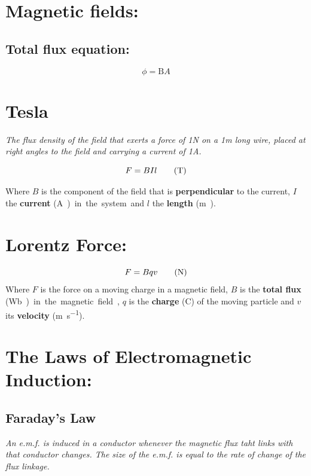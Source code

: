 \documentclass[11pt]{article}
\begin{document}
                          
\section{Magnetic fields: }
\subsection{Total flux equation: }
\begin{equation}
	\phi = \mathrm{B}A\tag{\si\weber}
\end{equation}


  \section{Tesla}
  \begin{center}
  	\textit{The flux density of the field that exerts a force of 1\si{\newton} on a 1\si{\meter} long wire, placed at right angles to the field and carrying a current of 1\si{\ampere}.}
  \end{center}
\begin{equation}
	F=BIl\tag{\si{\tesla}}
\end{equation}
\begin{center}
	Where $B$ is the component of the field that is \textbf{perpendicular} to the current, $I$ the \textbf{current} (\si\ampere) in the system and $l$ the \textbf{length} (\si\meter).
\end{center}
\section{Lorentz Force: }
\begin{equation}
	F=Bqv\tag{\si{\newton}}
\end{equation}
Where $F$ is the force on a moving charge in a magnetic field, $B$ is the \textbf{total flux} (\si\weber) in the magnetic field, $q$ is the \textbf{charge} (\si{\coulomb}) of the moving particle and $v$ its \textbf{velocity} (\si{\meter\per\second}).

\section{The Laws of Electromagnetic Induction: }

\subsection{Faraday's Law}

\begin{center}
	\textit{An e.m.f. is induced in a conductor whenever the magnetic flux taht links with that conductor changes. The size of the e.m.f. is equal to the rate of change of the flux linkage.}
\end{center}
\end{document}
